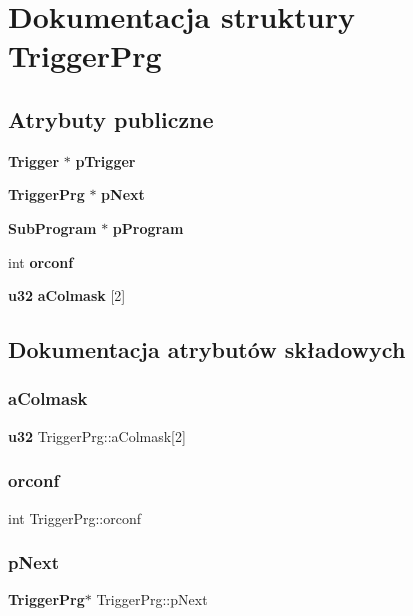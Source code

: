 \section{Dokumentacja struktury Trigger\+Prg}
\label{struct_trigger_prg}
\subsection*{Atrybuty publiczne}
\begin{DoxyCompactItemize}
\item 
\textbf{ Trigger} $\ast$ \textbf{ p\+Trigger}
\item 
\textbf{ Trigger\+Prg} $\ast$ \textbf{ p\+Next}
\item 
\textbf{ Sub\+Program} $\ast$ \textbf{ p\+Program}
\item 
int \textbf{ orconf}
\item 
\textbf{ u32} \textbf{ a\+Colmask} [2]
\end{DoxyCompactItemize}


\subsection{Dokumentacja atrybutów składowych}
\mbox{\label{struct_trigger_prg_aeac0a4cd1f1d287981ae33c4d171b614}} 
\subsubsection{aColmask}
{\footnotesize\ttfamily \textbf{ u32} Trigger\+Prg\+::a\+Colmask[2]}

\mbox{\label{struct_trigger_prg_aa475acda58c472b3491f6aa17020bf68}} 
\subsubsection{orconf}
{\footnotesize\ttfamily int Trigger\+Prg\+::orconf}

\mbox{\label{struct_trigger_prg_a551b8a29a8c4ff785afab1596e5d8710}} 
\subsubsection{pNext}
{\footnotesize\ttfamily \textbf{ Trigger\+Prg}$\ast$ Trigger\+Prg\+::p\+Next}

